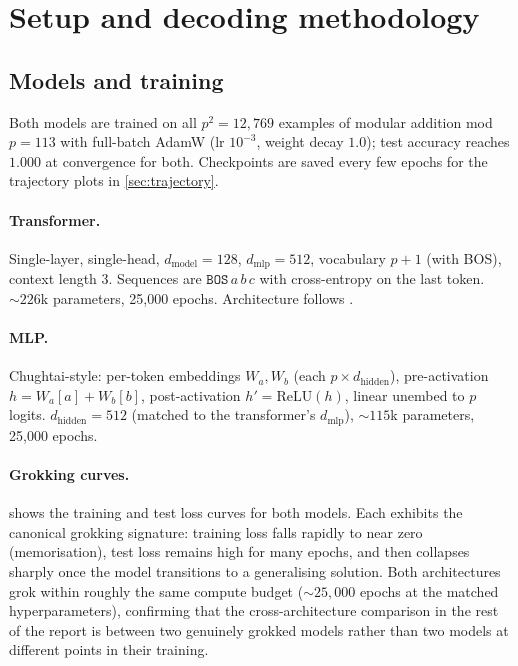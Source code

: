 \documentclass[11pt,a4paper]{article}
\begin{document}
\section{Setup and decoding methodology}\label{sec:methodology}

\subsection{Models and training}

Both models are trained on all $p^2 = 12{,}769$ examples of modular addition mod $p = 113$ with full-batch AdamW (lr $10^{-3}$, weight decay $1.0$); test accuracy reaches $1.000$ at convergence for both. Checkpoints are saved every few epochs for the trajectory plots in \cref{sec:trajectory}.

\paragraph{Transformer.} Single-layer, single-head, $d_{\mathrm{model}} = 128$, $d_{\mathrm{mlp}} = 512$, vocabulary $p + 1$ (with BOS), context length $3$. Sequences are $\texttt{BOS}\, a\, b\, c$ with cross-entropy on the last token. ${\sim}226$k parameters, 25{,}000 epochs. Architecture follows \citet{poncini2025compmech}.

\paragraph{MLP.} Chughtai-style: per-token embeddings $W_a, W_b$ (each $p \times d_{\mathrm{hidden}}$), pre-activation $h = W_a[a] + W_b[b]$, post-activation $h' = \mathrm{ReLU}(h)$, linear unembed to $p$ logits. $d_{\mathrm{hidden}} = 512$ (matched to the transformer's $d_{\mathrm{mlp}}$), ${\sim}115$k parameters, 25{,}000 epochs.

\paragraph{Grokking curves.}  shows the training and test loss curves for both models. Each exhibits the canonical grokking signature: training loss falls rapidly to near zero (memorisation), test loss remains high for many epochs, and then collapses sharply once the model transitions to a generalising solution. Both architectures grok within roughly the same compute budget ($\sim 25{,}000$ epochs at the matched hyperparameters), confirming that the cross-architecture comparison in the rest of the report is between two genuinely grokked models rather than two models at different points in their training.
\end{document}
